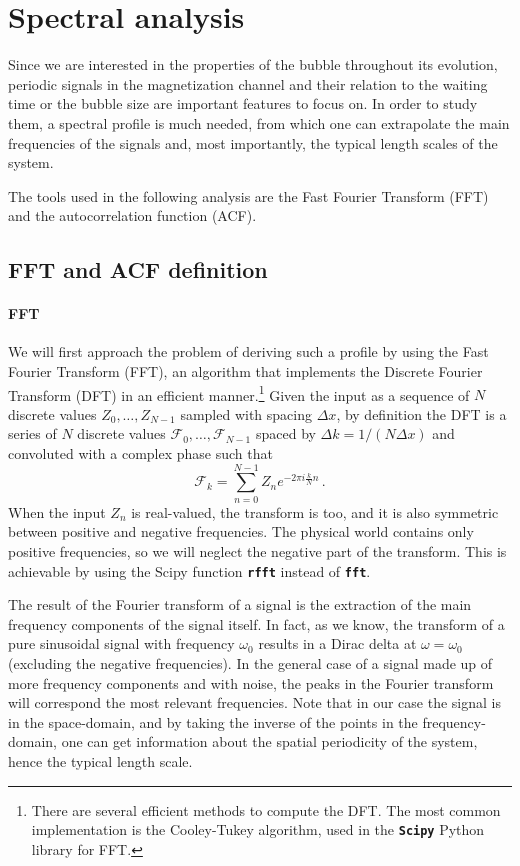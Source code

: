 \section{Spectral analysis}
Since we are interested in the properties of the bubble throughout its evolution, periodic signals in the magnetization channel and their relation to the waiting time or the bubble size are important features to focus on. In order to study them, a spectral profile is much needed, from which one can extrapolate the main frequencies of the signals and, most importantly, the typical length scales of the system.

The tools used in the following analysis are the Fast Fourier Transform (FFT) and the autocorrelation function (ACF).

\subsection{FFT and ACF definition}
\paragraph{FFT}
We will first approach the problem of deriving such a profile by using the Fast Fourier Transform (FFT), an algorithm that implements the Discrete Fourier Transform (DFT) in an efficient manner.\footnote{There are several efficient methods to compute the DFT. The most common implementation is the Cooley-Tukey algorithm, used in the \texttt{\textbf{Scipy}} Python library for FFT.} Given the input as a sequence of $N$ discrete values $Z_0,\dots,Z_{N-1}$ sampled with spacing $\Delta x$, by definition the DFT is a series of $N$ discrete values $\mathcal{F}_0,\dots,\mathcal{F}_{N-1}$ spaced by $\Delta k = 1/(N\Delta x)$ and convoluted with a complex phase such that
\begin{equation*}
    \mathcal{F}_k = \sum_{n=0}^{N-1} Z_n e^{-2\pi i \frac{k}{N}n}\, .
\end{equation*}
When the input $Z_n$ is real-valued, the transform is too, and it is also symmetric between positive and negative frequencies. The physical world contains only positive frequencies, so we will neglect the negative part of the transform. This is achievable by using the Scipy function \texttt{\textbf{rfft}} instead of \texttt{\textbf{fft}}.

The result of the Fourier transform of a signal is the extraction of the main frequency components of the signal itself. In fact, as we know, the transform of a pure sinusoidal signal with frequency $\omega_0$ results in a Dirac delta at $\omega = \omega_0$ (excluding the negative frequencies). In the general case of a signal made up of more frequency components and with noise, the peaks in the Fourier transform will correspond the most relevant frequencies. Note that in our case the signal is in the space-domain, and by taking the inverse of the points in the frequency-domain, one can get information about the spatial periodicity of the system, hence the typical length scale.

